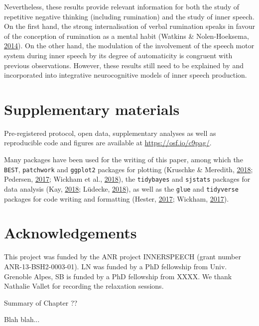 \documentclass[a4paper,12pt,twoside,openright,oldfontcommands]{memoir}
\newcommand\getcurrentref[1]{
 \ifnumequal{\value{#1}}{0}
  {??}
  {\the\value{#1}}
}
\begin{document}
Nevertheless, these results provide relevant information for both the study of repetitive negative thinking (including rumination) and the study of inner speech. On the first hand, the strong internalisation of verbal rumination speaks in favour of the conception of rumination as a mental habit (Watkins \& Nolen-Hoeksema, \protect\hyperlink{ref-watkins_habit-goal_2014}{2014}). On the other hand, the modulation of the involvement of the speech motor system during inner speech by its degree of automaticity is congruent with previous observations. However, these results still need to be explained by and incorporated into integrative neurocognitive models of inner speech production.

\hypertarget{suppCh4}{%
\section{Supplementary materials}\label{suppCh4}}

Pre-registered protocol, open data, supplementary analyses as well as reproducible code and figures are available at \url{https://osf.io/c9pag/}.

Many packages have been used for the writing of this paper, among which the \texttt{BEST}, \texttt{patchwork} and \texttt{ggplot2} packages for plotting (Kruschke \& Meredith, \protect\hyperlink{ref-R-BEST}{2018}; Pedersen, \protect\hyperlink{ref-R-patchwork}{2017}; Wickham et al., \protect\hyperlink{ref-R-ggplot2}{2018}), the \texttt{tidybayes} and \texttt{sjstats} packages for data analysis (Kay, \protect\hyperlink{ref-R-tidybayes}{2018}; Lüdecke, \protect\hyperlink{ref-R-sjstats}{2018}), as well as the \texttt{glue} and \texttt{tidyverse} packages for code writing and formatting (Hester, \protect\hyperlink{ref-R-glue}{2017}; Wickham, \protect\hyperlink{ref-R-tidyverse}{2017}).

\hypertarget{acknowledgements-1}{%
\section{Acknowledgements}\label{acknowledgements-1}}

This project was funded by the ANR project INNERSPEECH (grant number ANR-13-BSH2-0003-01). LN was funded by a PhD fellowship from Univ. Grenoble Alpes, SB is funded by a PhD fellowship from XXXX. We thank Nathalie Vallet for recording the relaxation sessions.

\newpage

\begin{vplace}[1]

\begin{summary}{Summary of Chapter\getcurrentref{chapter}}

Blah blah...

\end{summary}

\end{vplace}
\end{document}
